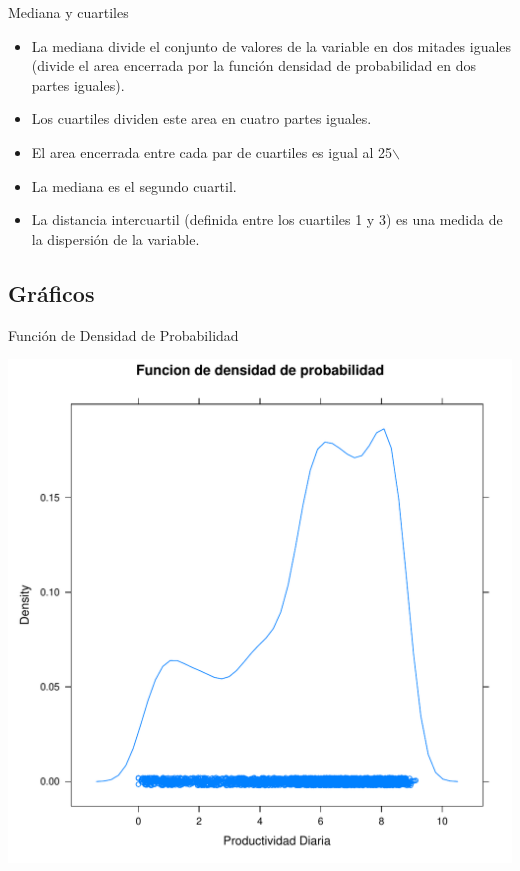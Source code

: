 \documentclass[xcolor={usenames,svgnames,dvipsnames}]{beamer}
\begin{document}
\begin{frame}[label={sec:orgd115a2a}]{Mediana y cuartiles}
\begin{itemize}
\item La \alert{mediana} divide el conjunto de valores de la variable en \alert{dos
mitades} iguales (divide el area encerrada por la función densidad
de probabilidad en dos partes iguales).
\item Los \alert{cuartiles} dividen este area en \alert{cuatro} partes iguales.
\item El area encerrada entre cada par de cuartiles es igual al 25$\backslash$%
\item La \alert{mediana} es el \alert{segundo cuartil}.
\item La \alert{distancia intercuartil} (definida entre los cuartiles 1 y 3) es
una \alert{medida de la dispersión} de la variable.
\end{itemize}
\end{frame}


\subsection{Gráficos}
\label{sec:org1aa8a43}


\begin{frame}[label={sec:org296b6ed}]{Función de Densidad de Probabilidad}
\begin{center}
\includegraphics[width=.9\linewidth]{../figs/FuncionDensidadProbabilidad.pdf}
\end{center}
\end{frame}
\end{document}

